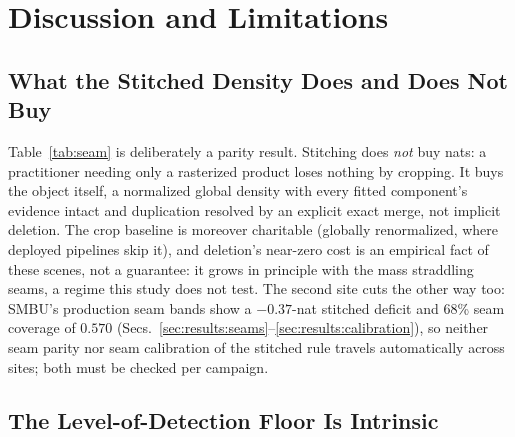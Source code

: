 
\section{Discussion and Limitations}
\label{sec:discussion}

\subsection{What the Stitched Density Does and Does Not Buy}
\label{sec:disc-stitch}

 Table~\ref{tab:seam} is deliberately a parity result. Stitching does
\emph{not} buy nats: a practitioner needing only a rasterized product
loses nothing by cropping. It buys the object itself, a normalized
global density with every fitted component's evidence intact and
duplication resolved by an explicit exact merge, not implicit
deletion. The crop baseline is moreover charitable (globally
renormalized, where deployed pipelines skip it), and deletion's
near-zero cost is an empirical fact of these scenes, not a guarantee:
it grows in principle with the mass straddling seams, a regime this
study does not test. The second site cuts the other way too: SMBU's production
seam bands show a $-0.37$-nat stitched deficit and 68\% seam coverage
of $0.570$ (Secs.~\ref{sec:results:seams}--\ref{sec:results:calibration}),
so neither seam parity nor seam calibration of the stitched rule
travels automatically across sites; both must be checked per campaign.

\subsection{The Level-of-Detection Floor Is Intrinsic}
\label{sec:disc-lod}

